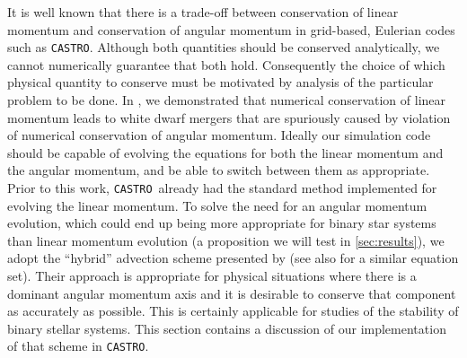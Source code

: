 \documentclass[twocolumn,numberedappendix]{../aastex60}
\newcommand{\castro}{\texttt{CASTRO}}
\begin{document}
It is well known that there is a trade-off between conservation of linear
momentum and conservation of angular momentum in grid-based, Eulerian codes
such as \castro. Although both quantities should be conserved analytically, we cannot
numerically guarantee that both hold. Consequently the choice of which
physical quantity to conserve must be motivated by analysis of the particular
problem to be done. In \cite{wdmergerI}, we demonstrated that numerical conservation
of linear momentum leads to white dwarf mergers that are spuriously caused by violation
of numerical conservation of angular momentum. Ideally our simulation code should be capable of evolving the
equations for both the linear momentum and the angular momentum, and be
able to switch between them as appropriate. Prior to this work, \castro\
already had the standard method implemented for evolving the linear momentum.
To solve the need for an angular momentum evolution, which could end up being more
appropriate for binary star systems than linear momentum evolution (a proposition we
will test in \autoref{sec:results}), we adopt the ``hybrid''
advection scheme presented by \cite{byerly:2014} (see also \cite{motl:2002} for
a similar equation set). Their approach is appropriate for physical situations
where there is a dominant angular momentum axis and it is desirable to conserve
that component as accurately as possible. This is certainly applicable for
studies of the stability of binary stellar systems. This section contains a
discussion of our implementation of that scheme in \castro.
\end{document}
